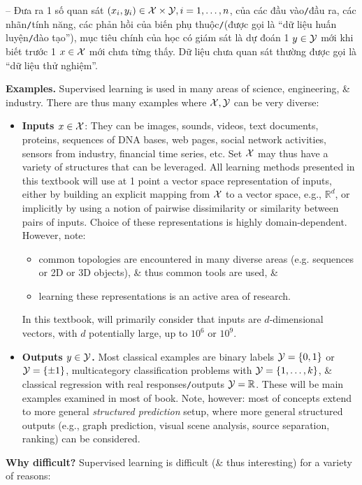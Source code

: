 \documentclass{article}
\begin{document}
-- Đưa ra 1 số quan sát $(x_i,y_i)\in{\cal X}\times{\cal Y},i = 1,\ldots,n$, của các đầu vào{\tt/}đầu ra, các nhãn{\tt/}tính năng, các phản hồi của biến phụ thuộc{\tt/}(được gọi là ``dữ liệu huấn luyện{\tt/}đào tạo''), mục tiêu chính của học có giám sát là dự đoán 1 $y\in{\cal Y}$ mới khi biết trước 1 $x\in{\cal X}$ mới chưa từng thấy. Dữ liệu chưa quan sát thường được gọi là ``dữ liệu thử nghiệm''.

{\bf Examples.} Supervised learning is used in many areas of science, engineering, \& industry. There are thus many examples where ${\cal X},{\cal Y}$ can be very diverse:
\begin{itemize}
	\item {\bf Inputs $x\in{\cal X}$}: They can be images, sounds, videos, text documents, proteins, sequences of DNA bases, web pages, social network activities, sensors from industry, financial time series, etc. Set ${\cal X}$ may thus have a variety of structures that can be leveraged. All learning methods presented in this textbook will use at 1 point a vector space representation of inputs, either by building an explicit mapping from ${\cal X}$ to a vector space, e.g., $\mathbb{R}^d$, or implicitly by using a notion of pairwise dissimilarity or similarity between pairs of inputs. Choice of these representations is highly domain-dependent. However, note:
	\begin{itemize}
		\item common topologies are encountered in many diverse areas (e.g. sequences or 2D or 3D objects), \& thus common tools are used, \&
		\item learning these representations is an active area of research.
	\end{itemize}
	In this textbook, will primarily consider that inputs are $d$-dimensional vectors, with $d$ potentially large, up to $10^6$ or $10^9$.
	\item {\bf Outputs $y\in{\cal Y}$.} Most classical examples are binary labels ${\cal Y} = \{0,1\}$ or ${\cal Y} = \{\pm1\}$, multicategory classification problems with ${\cal Y} = \{1,\ldots,k\}$, \& classical regression with real responses{\tt/}outputs ${\cal Y} = \mathbb{R}$. These will be main examples examined in most of book. Note, however: most of concepts extend to more general \emph{structured prediction} setup, where more general structured outputs (e.g., graph prediction, visual scene analysis, source separation, ranking) can be considered.
\end{itemize}
{\bf Why difficult?} Supervised learning is difficult (\& thus interesting) for a variety of reasons:
\end{document}
